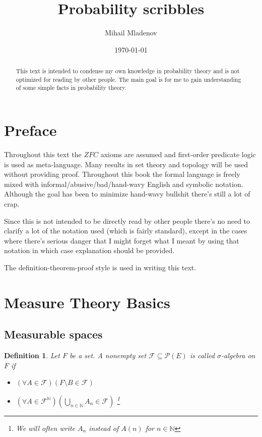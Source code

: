 \documentclass[a4paper]{amsart}
\newtheorem{deff}{Definition}
\newcommand{\pow}[1]{\mathscr{P}\left(#1\right)}
\newcommand{\NN}{\mathbb{N}}
\begin{document}
	
\author{Mihail Mladenov}
\title{Probability scribbles}
\date{\today}
 	
\begin{abstract}
    This text is intended to condense my own knowledge in probability theory and is not optimized for reading by other people. The main goal is for me to gain understanding of some simple facts in probability theory.
\end{abstract}

\maketitle

\tableofcontents
\newpage

\section{Preface}

Throughout this text the $ZFC$ axioms are assumed and 
first-order predicate logic is used as meta-language. Many 
results in set theory and topology will be used without 
providing proof. Throughout this book the formal language is 
freely mixed with informal/abusive/bad/hand-wavy English 
and symbolic notation. Although the goal has been to 
minimize hand-wavy bullshit there's still a lot of crap. 

Since this is not intended to be directly read by other people 
there's no need to clarify a lot of the notation used (which is fairly standard),
except in the cases where there's serious danger that I might forget 
what I meant by using that notation in which case 
explanation should be provided.

The definition-theorem-proof style is used in writing this text.


\section{Measure Theory Basics}

\subsection{Measurable spaces}

\begin{deff}
    Let $F$ be a set. A nonempty set $\mathcal{F} \subseteq 
    \pow{E}$ is called $\sigma$-algebra on $F$ if
    
    \begin{itemize}
        \item $\left(\forall A \in \mathcal{F}\right)  \left( F 
        \setminus B \in \mathcal{F} \right)$
        \item $\left(\forall A \in \mathcal{F}^\NN\right) \left( 
        \bigcup\limits_{n\in \NN} A_n \in \mathcal{F} \right) $   
        \footnote{We will often write $A_n$ instead of $A(n)$ 
        for $n \in \NN$}
    \end{itemize}
\end{deff}
\end{document}
